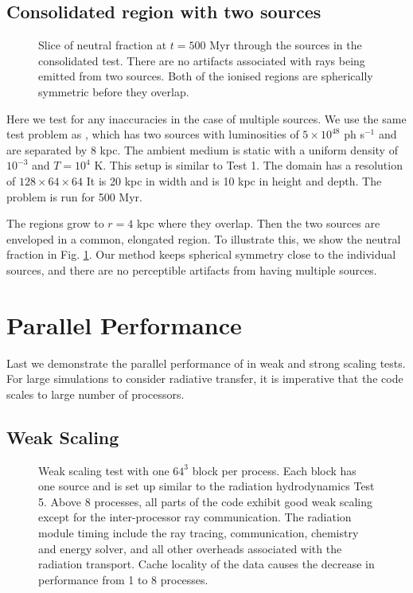 \documentclass[useAMS,usenatbib]{mn2e}
\begin{document}
\subsection{Consolidated \hii region with two sources}

\begin{figure}
  \caption{\label{fig:twosrc} Slice of neutral fraction at $t = 500$
    Myr through the sources in the consolidated \hii test.
    There are no artifacts associated with rays being emitted from two
    sources.  Both of the ionised regions are spherically symmetric
    before they overlap.}
\end{figure}

Here we test for any inaccuracies in the case of multiple sources.  We
use the same test problem as \citet[][\S5.1.2]{Petkova09}, which has
two sources with luminosities of $5 \times 10^{48}$ ph s$^{-1}$ and
are separated by 8 kpc.  The ambient medium is static with a uniform
density of $10^{-3}$ \cubecm and $T = 10^4$ K.  This setup is similar
to Test 1.  The domain has a resolution of $128 \times 64 \times 64$
It is 20 kpc in width and is 10 kpc in height and depth.  The problem
is run for 500 Myr.

The \hii regions grow to $r = 4$ kpc where they overlap.  Then
the two sources are enveloped in a common, elongated \hii
region.  To illustrate this, we show the neutral fraction in Fig.
\ref{fig:twosrc}.  Our method keeps spherical symmetry close to the
individual sources, and there are no perceptible artifacts from having
multiple sources.

\section{Parallel Performance}

Last we demonstrate the parallel performance of \moray in weak and
strong scaling tests.  For large simulations to consider radiative
transfer, it is imperative that the code scales to large number of
processors.

\subsection{Weak Scaling}
\label{sec:weak_sc}

\begin{figure}
  \caption{\label{fig:weak} Weak scaling test with one $64^3$ block
    per process.  Each block has one source and is set up similar to
    the radiation hydrodynamics Test 5.  Above 8 processes, all parts
    of the code exhibit good weak scaling except for the
    inter-processor ray communication.  The radiation module timing
    include the ray tracing, communication, chemistry and energy
    solver, and all other overheads associated with the radiation
    transport.  Cache locality of the data causes the decrease in
    performance from 1 to 8 processes.}
\end{figure}
\end{document}
